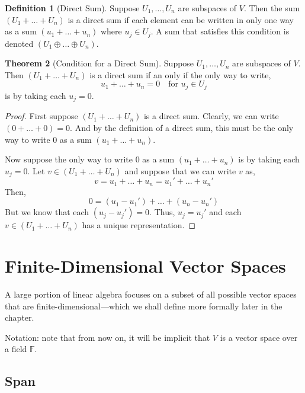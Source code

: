 \documentclass[12pt]{report}
\numberwithin{equation}{section}
\theoremstyle{definition}
\newtheorem{theorem}{Theorem}[section]
\newtheorem{definition}[theorem]{Definition}
\begin{document}
\begin{definition}[Direct Sum]
	Suppose $ U_1, \dots, U_n $ are subspaces of $ V $. Then the sum $ (U_1 + \dots + U_n)$ is a direct sum if each element can be written in only one way as a sum $ (u_1+\dots+u_n) $ where $ u_j\in U_j $. A sum that satisfies this condition is denoted $ (U_1 \oplus \dots \oplus U_n)$.
\end{definition}

\begin{theorem}[Condition for a Direct Sum]
	Suppose $ U_1, \dots, U_n $ are subspaces of $ V $. Then  $ (U_1 + \dots + U_n )$ is a direct sum if an only if the only way to write,
	\begin{equation}
			u_1 + \dots + u_n = 0 \quad \text{for } u_j\in U_j
	\end{equation}
	is by taking each $ u_j = 0 $.
	\label{thm:directsum}
\end{theorem}
\begin{proof}
	First suppose $ (U_1 + \dots + U_n )$ is a direct sum. Clearly, we can write $ (0 + \dots + 0) = 0 $. And by the definition of a direct sum, this must be the only way to write 0 as a sum $ (u_1 + \dots + u_n) $.
	
	Now suppose the only way to write 0 as a sum $ (u_1 + \dots + u_n) $ is by taking each $ u_j=0 $. Let $ v\in  (U_1 + \dots + U_n )$ and suppose that we can write $ v $ as,
	\begin{equation}
		v = u_1 + \dots + u_n= u_1' + \dots + u_n'
	\end{equation}
	Then,
	\begin{equation}
			0 = (u_1-u_1') + \dots + (u_n-u_n') 
	\end{equation}
	But we know that each $ ( u_j-u_j')= 0 $. Thus, $ u_j = u_j' $ and each $ v\in  (U_1 + \dots + U_n )$ has a unique representation.
\end{proof}

\chapter{Finite-Dimensional Vector Spaces}

A large portion of linear algebra focuses on a subset of all possible vector spaces that are finite-dimensional---which we shall define more formally later in the chapter. 

Notation: note that from now on, it will be implicit that $ V $ is a vector space over a field $ \mathbb{F} $.

\section{Span}
\end{document}
